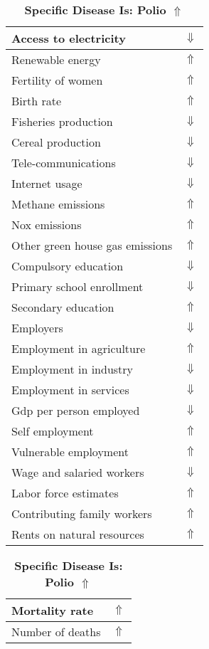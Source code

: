 \documentclass[12pt,notitlepage,oneside]{report}
\begin{document}
\begin{table}[!htb]
\caption{\textbf{Specific Disease Is: Polio $\Uparrow$}}
\centering
\label{Correlated Socio-economic Factors0}
\begin{tabular}{|l|l|}
\hline
Access to electricity & $\Downarrow$\\ \hline
Renewable energy & $\Uparrow$\\ \hline
Fertility of women & $\Uparrow$\\ \hline
Birth rate & $\Uparrow$\\ \hline
Fisheries production & $\Downarrow$\\ \hline
Cereal production & $\Downarrow$\\ \hline
Tele-communications & $\Downarrow$\\ \hline
Internet usage & $\Downarrow$\\ \hline
Methane emissions & $\Uparrow$\\ \hline
Nox emissions & $\Uparrow$\\ \hline
Other green house gas emissions & $\Uparrow$\\ \hline
Compulsory education & $\Downarrow$\\ \hline
Primary school enrollment & $\Downarrow$\\ \hline
Secondary education & $\Uparrow$\\ \hline
Employers & $\Downarrow$\\ \hline
Employment in agriculture & $\Uparrow$\\ \hline
Employment in industry & $\Downarrow$\\ \hline
Employment in services & $\Downarrow$\\ \hline
Gdp per person employed & $\Downarrow$\\ \hline
Self employment & $\Uparrow$\\ \hline
Vulnerable employment & $\Uparrow$\\ \hline
Wage and salaried workers & $\Downarrow$\\ \hline
Labor force estimates & $\Uparrow$\\ \hline
Contributing family workers & $\Uparrow$\\ \hline
Rents on natural resources & $\Uparrow$\\ \hline
\end{tabular}
\begin{tabular}{|l|l|}
\hline
Mortality rate & $\Uparrow$\\ \hline
Number of deaths & $\Uparrow$\\ \hline

\end{tabular}
\end{table}
\end{document}
